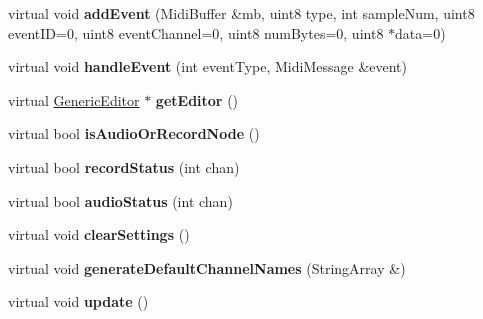 \begin{DoxyCompactItemize}
\item 
\hypertarget{classGenericProcessor_ad6edfd929eaffda941ebc61ebc8559a4}{virtual void {\bfseries add\-Event} (Midi\-Buffer \&mb, uint8 type, int sample\-Num, uint8 event\-I\-D=0, uint8 event\-Channel=0, uint8 num\-Bytes=0, uint8 $\ast$data=0)}\label{classGenericProcessor_ad6edfd929eaffda941ebc61ebc8559a4}

\item 
\hypertarget{classGenericProcessor_a304bd82f97d26b385dd99df04042723e}{virtual void {\bfseries handle\-Event} (int event\-Type, Midi\-Message \&event)}\label{classGenericProcessor_a304bd82f97d26b385dd99df04042723e}

\item 
\hypertarget{classGenericProcessor_ab2224d9c803f4282e8c8de729be58779}{virtual \hyperlink{classGenericEditor}{Generic\-Editor} $\ast$ {\bfseries get\-Editor} ()}\label{classGenericProcessor_ab2224d9c803f4282e8c8de729be58779}

\item 
\hypertarget{classGenericProcessor_a13960169926ae10febca934d12fbf4d7}{virtual bool {\bfseries is\-Audio\-Or\-Record\-Node} ()}\label{classGenericProcessor_a13960169926ae10febca934d12fbf4d7}

\item 
\hypertarget{classGenericProcessor_a6c4ac8dc9f66ffe8ccc100eb3cedbbe4}{virtual bool {\bfseries record\-Status} (int chan)}\label{classGenericProcessor_a6c4ac8dc9f66ffe8ccc100eb3cedbbe4}

\item 
\hypertarget{classGenericProcessor_a29cd0895c183a1edb44ab3b3e7f3b262}{virtual bool {\bfseries audio\-Status} (int chan)}\label{classGenericProcessor_a29cd0895c183a1edb44ab3b3e7f3b262}

\item 
\hypertarget{classGenericProcessor_a860285332129a657c4e479a1ba59fa18}{virtual void {\bfseries clear\-Settings} ()}\label{classGenericProcessor_a860285332129a657c4e479a1ba59fa18}

\item 
\hypertarget{classGenericProcessor_a5302ede3e22cc1511390dae4a7511766}{virtual void {\bfseries generate\-Default\-Channel\-Names} (String\-Array \&)}\label{classGenericProcessor_a5302ede3e22cc1511390dae4a7511766}

\item 
\hypertarget{classGenericProcessor_a73073787f0a760c1896522c934e94211}{virtual void {\bfseries update} ()}\label{classGenericProcessor_a73073787f0a760c1896522c934e94211}


\end{DoxyCompactItemize}
